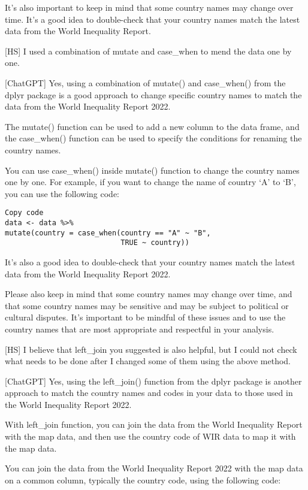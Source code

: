 \documentclass[
]{book}
\theoremstyle{definition}
\theoremstyle{definition}
\theoremstyle{definition}
\theoremstyle{definition}
\theoremstyle{remark}
\begin{document}
It's also important to keep in mind that some country names may change over time. It's a good idea to double-check that your country names match the latest data from the World Inequality Report.

{[}HS{]} I used a combination of mutate and case\_when to mend the data one by one.

{[}ChatGPT{]} Yes, using a combination of mutate() and case\_when() from the dplyr package is a good approach to change specific country names to match the data from the World Inequality Report 2022.

The mutate() function can be used to add a new column to the data frame, and the case\_when() function can be used to specify the conditions for renaming the country names.

You can use case\_when() inside mutate() function to change the country names one by one. For example, if you want to change the name of country `A' to `B', you can use the following code:

\begin{verbatim}
Copy code
data <- data %>%
mutate(country = case_when(country == "A" ~ "B",
                           TRUE ~ country))
\end{verbatim}

It's also a good idea to double-check that your country names match the latest data from the World Inequality Report 2022.

Please also keep in mind that some country names may change over time, and that some country names may be sensitive and may be subject to political or cultural disputes. It's important to be mindful of these issues and to use the country names that are most appropriate and respectful in your analysis.

{[}HS{]} I believe that left\_join you suggested is also helpful, but I could not check what needs to be done after I changed some of them using the above method.

{[}ChatGPT{]} Yes, using the left\_join() function from the dplyr package is another approach to match the country names and codes in your data to those used in the World Inequality Report 2022.

With left\_join function, you can join the data from the World Inequality Report with the map data, and then use the country code of WIR data to map it with the map data.

You can join the data from the World Inequality Report 2022 with the map data on a common column, typically the country code, using the following code:
\end{document}
